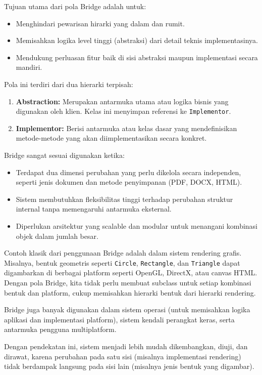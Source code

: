 Tujuan utama dari pola Bridge adalah untuk:
\begin{itemize}
	\item Menghindari pewarisan hirarki yang dalam dan rumit.
	\item Memisahkan logika level tinggi (abstraksi) dari detail teknis implementasinya.
	\item Mendukung perluasan fitur baik di sisi abstraksi maupun implementasi secara mandiri.
\end{itemize}

Pola ini terdiri dari dua hierarki terpisah:
\begin{enumerate}
	\item \textbf{Abstraction:} Merupakan antarmuka utama atau logika bisnis yang digunakan oleh klien. Kelas ini menyimpan referensi ke \texttt{Implementor}.
	\item \textbf{Implementor:} Berisi antarmuka atau kelas dasar yang mendefinisikan metode-metode yang akan diimplementasikan secara konkret.
\end{enumerate}

Bridge sangat sesuai digunakan ketika:
\begin{itemize}
	\item Terdapat dua dimensi perubahan yang perlu dikelola secara independen, seperti jenis dokumen dan metode penyimpanan (PDF, DOCX, HTML).
	\item Sistem membutuhkan fleksibilitas tinggi terhadap perubahan struktur internal tanpa memengaruhi antarmuka eksternal.
	\item Diperlukan arsitektur yang scalable dan modular untuk menangani kombinasi objek dalam jumlah besar.
\end{itemize}

Contoh klasik dari penggunaan Bridge adalah dalam sistem rendering grafis. Misalnya, bentuk geometris seperti \texttt{Circle}, \texttt{Rectangle}, dan \texttt{Triangle} dapat digambarkan di berbagai platform seperti OpenGL, DirectX, atau canvas HTML. Dengan pola Bridge, kita tidak perlu membuat subclass untuk setiap kombinasi bentuk dan platform, cukup memisahkan hierarki bentuk dari hierarki rendering.

Bridge juga banyak digunakan dalam sistem operasi (untuk memisahkan logika aplikasi dan implementasi platform), sistem kendali perangkat keras, serta antarmuka pengguna multiplatform.

Dengan pendekatan ini, sistem menjadi lebih mudah dikembangkan, diuji, dan dirawat, karena perubahan pada satu sisi (misalnya implementasi rendering) tidak berdampak langsung pada sisi lain (misalnya jenis bentuk yang digambar).

